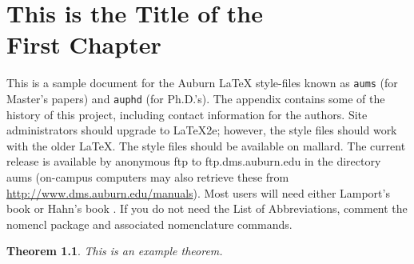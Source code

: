 \documentclass[12pt]{report}
\newtheorem{theorem}{Theorem}[chapter]
\begin{document}
\normalem       %

\chapter{This is the Title of the\\ First Chapter}  %
This is a sample document for the Auburn  \LaTeX{} style-files known
as {\tt aums} (for Master's papers) and {\tt auphd} (for Ph.D.'s).
The appendix contains some of the history of this project, including
contact information for the authors. 
Site administrators should upgrade to \LaTeX2e; however, the style files
should work with the older \LaTeX.  \vfill The style files should be available
on mallard.  The current release is available by anonymous ftp to
ftp.dms.auburn.edu in the directory aums (on-campus computers may
also retrieve these from \url{http://www.dms.auburn.edu/manuals}).
Most users will need either Lamport's book \cite{lamport} or Hahn's book
\cite{hahn}.%
If you do not need the List of Abbreviations, comment the nomencl package and associated nomenclature commands. 
\begin{theorem} This is an example theorem.
\end{theorem}%
\end{document}

